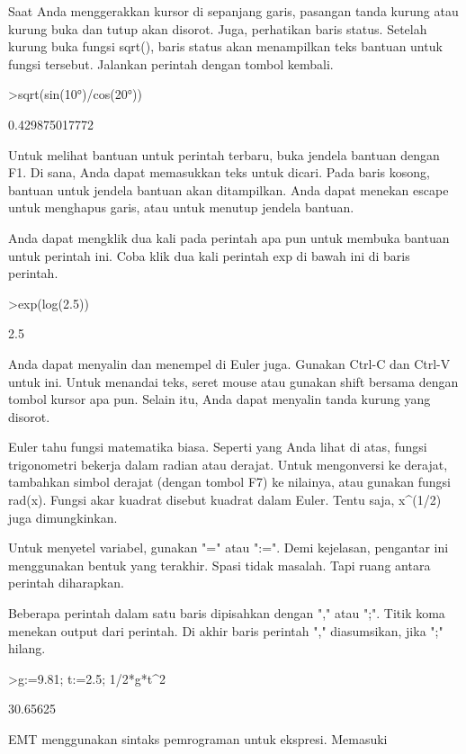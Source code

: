 \documentclass[a4paper,10pt]{article}
\begin{document}
\begin{eulernotebook}
\begin{eulercomment}
Saat Anda menggerakkan kursor di sepanjang garis, pasangan tanda
kurung atau kurung buka dan tutup akan disorot. Juga, perhatikan baris
status. Setelah kurung buka fungsi sqrt(), baris status akan
menampilkan teks bantuan untuk fungsi tersebut. Jalankan perintah
dengan tombol kembali.
\end{eulercomment}
\begin{eulerprompt}
>sqrt(sin(10°)/cos(20°))
\end{eulerprompt}
\begin{euleroutput}
  0.429875017772
\end{euleroutput}
\begin{eulercomment}
Untuk melihat bantuan untuk perintah terbaru, buka jendela bantuan
dengan F1. Di sana, Anda dapat memasukkan teks untuk dicari. Pada
baris kosong, bantuan untuk jendela bantuan akan ditampilkan. Anda
dapat menekan escape untuk menghapus garis, atau untuk menutup jendela
bantuan.

Anda dapat mengklik dua kali pada perintah apa pun untuk membuka
bantuan untuk perintah ini. Coba klik dua kali perintah exp di bawah
ini di baris perintah.
\end{eulercomment}
\begin{eulerprompt}
>exp(log(2.5))
\end{eulerprompt}
\begin{euleroutput}
  2.5
\end{euleroutput}
\begin{eulercomment}
Anda dapat menyalin dan menempel di Euler juga. Gunakan Ctrl-C dan
Ctrl-V untuk ini. Untuk menandai teks, seret mouse atau gunakan shift
bersama dengan tombol kursor apa pun. Selain itu, Anda dapat menyalin
tanda kurung yang disorot.
\end{eulercomment}
\begin{eulercomment}
Euler tahu fungsi matematika biasa. Seperti yang Anda lihat di atas,
fungsi trigonometri bekerja dalam radian atau derajat. Untuk
mengonversi ke derajat, tambahkan simbol derajat (dengan tombol F7) ke
nilainya, atau gunakan fungsi rad(x). Fungsi akar kuadrat disebut
kuadrat dalam Euler. Tentu saja, x\textasciicircum{}(1/2) juga dimungkinkan.

Untuk menyetel variabel, gunakan "=" atau ":=". Demi kejelasan,
pengantar ini menggunakan bentuk yang terakhir. Spasi tidak masalah.
Tapi ruang antara perintah diharapkan.

Beberapa perintah dalam satu baris dipisahkan dengan "," atau ";".
Titik koma menekan output dari perintah. Di akhir baris perintah ","
diasumsikan, jika ";" hilang.
\end{eulercomment}
\begin{eulerprompt}
>g:=9.81; t:=2.5; 1/2*g*t^2
\end{eulerprompt}
\begin{euleroutput}
  30.65625
\end{euleroutput}
\begin{eulercomment}
EMT menggunakan sintaks pemrograman untuk ekspresi. Memasuki


\end{eulercomment}
\end{eulernotebook}
\end{document}
